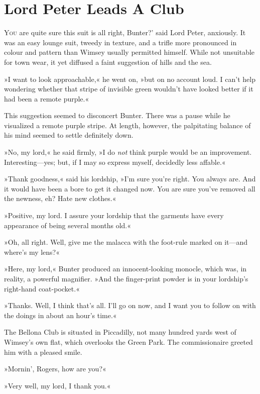 \chapter{Lord Peter Leads A Club}
\lettrine[lines=4,ante=‘]{Y}{ou} are quite sure this suit is all right, Bunter?' said Lord Peter, anxiously. It was an easy lounge suit, tweedy in texture, and a trifle more pronounced in colour and pattern than Wimsey usually permitted himself. While not unsuitable for town wear, it yet diffused a faint suggestion of hills and the sea.

»I want to look approachable,« he went on, »but on no account loud. I can't help wondering whether that stripe of invisible green wouldn't have looked better if it had been a remote purple.«

This suggestion seemed to disconcert Bunter. There was a pause while he visualized a remote purple stripe. At length, however, the palpitating balance of his mind seemed to settle definitely down.

»No, my lord,« he said firmly, »I do \textit{not} think purple would be an improvement. Interesting\allowbreak---\allowbreak yes; but, if I may so express myself, decidedly less affable.«

»Thank goodness,« said his lordship, »I'm sure you're right. You always are. And it would have been a bore to get it changed now. You are sure you've removed all the newness, eh? Hate new clothes.«

»Positive, my lord. I assure your lordship that the garments have every appearance of being several months old.«

»Oh, all right. Well, give me the malacca with the foot-rule marked on it\allowbreak---\allowbreak and where's my lens?«

»Here, my lord,« Bunter produced an innocent-looking monocle, which was, in reality, a powerful magnifier. »And the finger-print powder is in your lordship's right-hand coat-pocket.«

»Thanks. Well, I think that's all. I'll go on now, and I want you to follow on with the doings in about an hour's time.«

The Bellona Club is situated in Piccadilly, not many hundred yards west of Wimsey's own flat, which overlooks the Green Park. The commissionaire greeted him with a pleased smile.

»Mornin', Rogers, how are you?«

»Very well, my lord, I thank you.«

